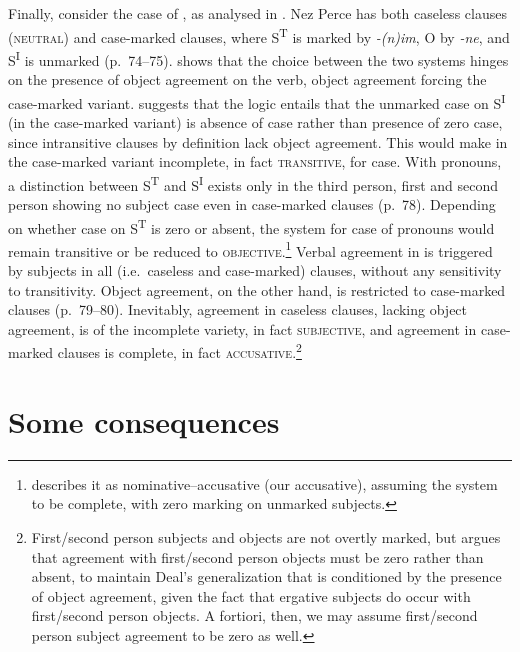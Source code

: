 \documentclass[output=paper]{langsci/langscibook}
\begin{document}
Finally, consider the case of , as analysed in \citet{Deal2010}.
Nez Perce has both caseless clauses (\textsc{neutral}) and case-marked clauses,
where S\textsuperscript{T} is mark\-ed by \emph{-(n)im}, O by \emph{-ne}, and
S\textsuperscript{I} is unmarked (p.\ 74--75). \citet{Deal2010} shows that the
choice between the two systems hinges on the presence of object agreement on
the verb, object agreement forcing the case-marked variant.
\citet{Lindenbergh2015} suggests that the logic entails that the unmarked case
on S\textsuperscript{I} (in the case-marked variant) is absence of case rather
than presence of zero case, since intransitive clauses by definition lack
object agreement. This would make  in the case-marked variant
incomplete, in fact \textsc{transitive}, for case. With pronouns, a distinction
between S\textsuperscript{T} and S\textsuperscript{I} exists only in the third
person, first and second person showing no subject case even in case-marked clauses
(p.\ 78). Depending on whether case on S\textsuperscript{T} is zero or absent,
the system for case of pronouns would remain transitive or be reduced to
\textsc{objective}.\footnote{\citet{Deal2010} describes it as
nominative--accusative (our accusative), assuming the system to be complete,
with zero marking on unmarked subjects.}  Verbal agreement in  is
triggered by subjects in all (i.e.\ caseless and case-marked) clauses, without
any sensitivity to transitivity. Object agreement, on the other hand, is
restricted to case-marked clauses (p.\ 79--80). Inevitably, agreement in caseless
clauses, lacking object agreement, is of the incomplete variety, in fact
\textsc{subjective}, and agreement in case-marked clauses is complete, in fact
\textsc{accusative}.\footnote{First/second person subjects and objects are not
    overtly marked, but \citet{Lindenbergh2015} argues that agreement with
    first/second person objects must be zero rather than absent, to maintain
    Deal’s generalization that  is conditioned by the presence of
    object agreement, given the fact that ergative subjects do occur with
first/second person objects. A fortiori, then, we may assume first/second
person subject agreement to be zero as well.}

\section{Some consequences}\label{sec:11.5}
\end{document}
